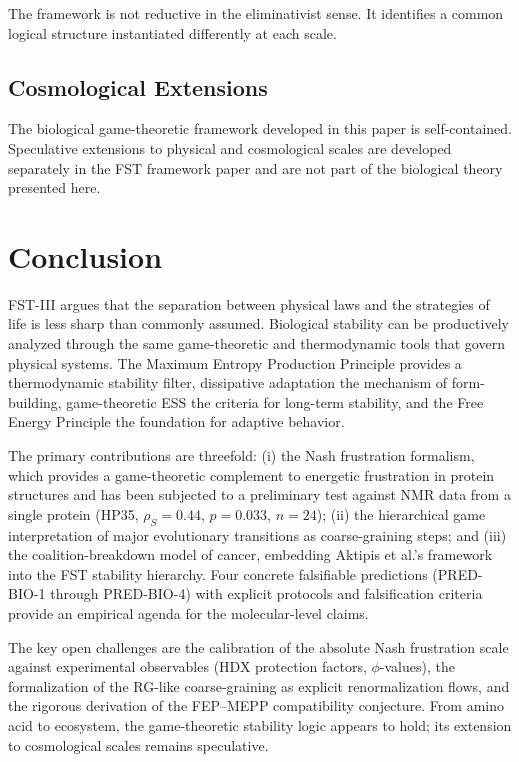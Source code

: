\documentclass[12pt,a4paper]{article}
\theoremstyle{remark}
\begin{document}
The framework is not reductive in the eliminativist sense. It identifies a common logical structure instantiated differently at each scale.

\subsection{Cosmological Extensions}
\label{sec:cosmology}

The biological game-theoretic framework developed in this paper is self-contained. Speculative extensions to physical and cosmological scales are developed separately in the FST framework paper \citep{FST-Unified2026} and are not part of the biological theory presented here.

\section{Conclusion}
\label{sec:conclusion}

FST-III argues that the separation between physical laws and the strategies of life is less sharp than commonly assumed. Biological stability can be productively analyzed through the same game-theoretic and thermodynamic tools that govern physical systems. The Maximum Entropy Production Principle provides a thermodynamic stability filter, dissipative adaptation the mechanism of form-building, game-theoretic ESS the criteria for long-term stability, and the Free Energy Principle the foundation for adaptive behavior.

The primary contributions are threefold: (i) the Nash frustration formalism, which provides a game-theoretic complement to energetic frustration in protein structures and has been subjected to a preliminary test against NMR data from a single protein (HP35, $\rho_S = 0.44$, $p = 0.033$, $n = 24$); (ii) the hierarchical game interpretation of major evolutionary transitions as coarse-graining steps; and (iii) the coalition-breakdown model of cancer, embedding Aktipis et al.'s framework into the FST stability hierarchy. Four concrete falsifiable predictions (PRED-BIO-1 through PRED-BIO-4) with explicit protocols and falsification criteria provide an empirical agenda for the molecular-level claims.

The key open challenges are the calibration of the absolute Nash frustration scale against experimental observables (HDX protection factors, $\phi$-values), the formalization of the RG-like coarse-graining as explicit renormalization flows, and the rigorous derivation of the FEP--MEPP compatibility conjecture. From amino acid to ecosystem, the game-theoretic stability logic appears to hold; its extension to cosmological scales \citep{FST-Unified2026} remains speculative.
\end{document}
